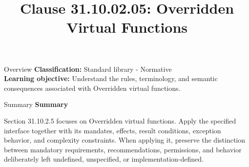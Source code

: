 \documentclass[10pt,letterpaper]{article}
\title{Clause 31.10.02.05: Overridden Virtual Functions}
\author{}
\date{}
\begin{document}
\maketitle
\begin{CornellOverviewBox}{Overview}
\textbf{Classification:} Standard library - Normative\\[2pt]
\textbf{Learning objective:} Understand the rules, terminology, and semantic consequences associated with Overridden virtual functions.
\end{CornellOverviewBox}\begin{CornellSummaryBox}{Summary}
{\sffamily\bfseries\color{Accent} Summary}\par\vspace{3pt}Section 31.10.2.5 focuses on Overridden virtual functions. Apply the specified interface together with its mandates, effects, result conditions, exception behavior, and complexity constraints. When applying it, preserve the distinction between mandatory requirements, recommendations, permissions, and behavior deliberately left undefined, unspecified, or implementation-defined.
\end{CornellSummaryBox}
\end{document}
